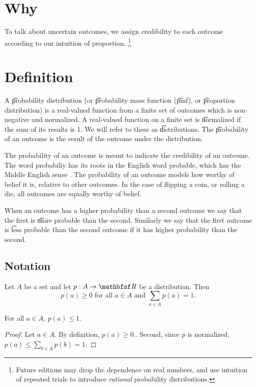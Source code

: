 
\section*{Why}

To talk about uncertain outcomes, we assign credibility to each outcome according to our intuition of proportion.
  \ifhmode\unskip\fi\footnote{
Future editions may drop the dependence on real numbers, and use intuition of repeated trials to introduce \textit{rational} probability distributions.
  }

\section*{Definition}

A \t{probability distribution} (or \t{probability mass function} (\t{pmf}), or \t{proportion distribution}) is a real-valued function from a finite set of outcomes which is non-negative and normalized.
A real-valued function on a finite set is \t{normalized} if the sum of its results is 1.
We will refer to these as \t{distributions}.
The \t{probability of an outcome} is the result of the outcome under the distribution.

The probability of an outcome is meant to indicate the credibility of an outcome.
The word probabiliy has its roots in the English word probable, which has the Middle English sense .
The probability of an outcome models how worthy of belief it is, relative to other outcomes.
In the case of flipping a coin, or rolling a die, all outcomes are equally worthy of belief.

When an outcome has a higher probability than a second outcome we say that the first is \t{more probable} than the second.
Similarly we say that the first outcome is \t{less probable} than the second outcome if it has higher probability than the second.

\subsection*{Notation}

Let $A$ be a set and let $p: A \to \R $ be a distribution.
Then
  \[
\textstyle
p(a) \geq 0 \text{ for all } a \in A \text{ and } \sum_{a \in A} p(a) = 1.
  \]

\begin{proposition}
For all $a \in A$, $p(a) \leq 1$.
\begin{proof}
Let $a \in A$.
By definition, $p(a) \geq 0$..
Second, since $p$ is normalized, $p(a) \leq \sum_{b \in A} p(b) = 1$.
\end{proof}
\end{proposition}

